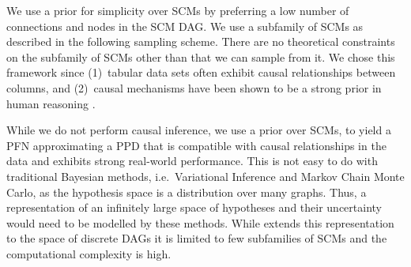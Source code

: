 \documentclass{article}
\newcommand{\frank}[1]{\todo[inline,color=yellow]{Frank: #1}}
\newcommand{\sam}[1]{\todo[inline,color=green]{Sam: #1}}
\begin{document}
We use a prior for simplicity over SCMs by preferring a low number of connections and nodes in the SCM DAG. We use a subfamily of SCMs as described in the following sampling scheme. There are no theoretical constraints on the subfamily of SCMs other than that we can sample from it.
We chose this framework since (1)~tabular data sets often exhibit causal relationships between columns, and (2)~causal mechanisms have been shown to be a strong prior in human reasoning \citep{waldmann2013causal, explanatoryvalues}.

While we do not perform causal inference, we use a prior over SCMs, to yield a PFN approximating a PPD that is compatible with causal relationships in the data and exhibits strong real-world performance.
This is not easy to do with traditional Bayesian methods, i.e.\ Variational Inference and Markov Chain Monte Carlo, as the hypothesis space is a distribution over many graphs. Thus, a representation of an infinitely large space of hypotheses and their uncertainty would need to be modelled by these methods. While \citet{annadani2021variational} extends this representation to the space of discrete DAGs it is limited to few subfamilies of SCMs and the computational complexity is high.
\end{document}
